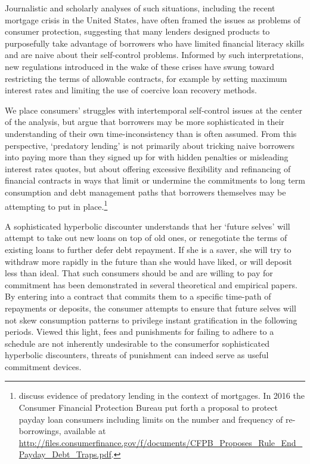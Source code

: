 \documentclass[11pt,english]{article}
\theoremstyle{plain}
\theoremstyle{definition}
\begin{document}
Journalistic and scholarly analyses of such situations, including
the recent mortgage crisis in the United States, have often framed
the issues as problems of consumer protection, suggesting that many
lenders designed products to purposefully take advantage of borrowers
who have limited financial literacy skills and are naive about their
self-control problems. Informed by such interpretations, new regulations
introduced in the wake of these crises have swung toward restricting
the terms of allowable contracts, for example by setting maximum interest
rates and limiting the use of coercive loan recovery methods.

We place consumers' struggles with intertemporal self-control issues
at the center of the analysis, but argue that borrowers may be more
sophisticated in their understanding of their own time-inconsistency
than is often assumed. From this perspective, `predatory lending'
is not primarily about tricking naive borrowers into paying more than
they signed up for with hidden penalties or misleading interest rates
quotes, but about offering excessive flexibility and refinancing of
financial contracts in ways that limit or undermine the commitments
to long term consumption and debt management paths that borrowers
themselves may be attempting to put in place.\footnote{\citet{bond2009} discuss evidence of predatory lending
in the context of mortgages. In 2016 the Consumer Financial Protection
Bureau put forth a proposal to protect payday loan consumers including
limits on the number and frequency of re-borrowings, available at
\url{http://files.consumerfinance.gov/f/documents/CFPB_Proposes_Rule_End_Payday_Debt_Traps.pdf}.}

A sophisticated hyperbolic discounter understands that her `future
selves' will attempt to take out new loans on top of old ones, or
renegotiate the terms of existing loans to further defer debt repayment.
If she is a saver, she will try to withdraw more rapidly in the future
than she would have liked, or will deposit less than ideal. That such
consumers should be and are willing to pay for commitment has been
demonstrated in several theoretical and empirical papers. By entering
into a contract that commits them to a specific time-path of repayments
or deposits, the consumer attempts to ensure that future selves will
not skew consumption patterns to privilege instant gratification in
the following periods. Viewed this light, fees and punishments for
failing to adhere to a schedule are not inherently undesirable to
the consumer\textendash for sophisticated hyperbolic discounters,
threats of punishment can indeed serve as useful commitment devices.
\end{document}
